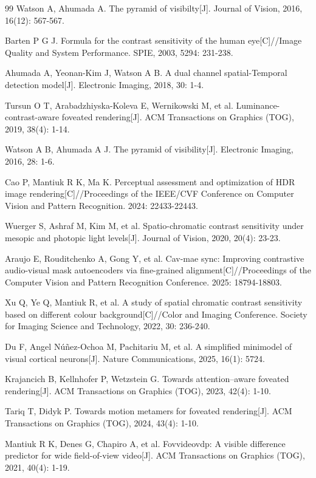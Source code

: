 \begin{thebibliography}{99}
Watson A, Ahumada A. The pyramid of visibilty[J]. Journal of Vision, 2016, 16(12): 567-567.

Barten P G J. Formula for the contrast sensitivity of the human eye[C]//Image Quality and System Performance. SPIE, 2003, 5294: 231-238.

Ahumada A, Yeonan-Kim J, Watson A B. A dual channel spatial-Temporal detection model[J]. Electronic Imaging, 2018, 30: 1-4.

Tursun O T, Arabadzhiyska-Koleva E, Wernikowski M, et al. Luminance-contrast-aware foveated rendering[J]. ACM Transactions on Graphics (TOG), 2019, 38(4): 1-14.

Watson A B, Ahumada A J. The pyramid of visibility[J]. Electronic Imaging, 2016, 28: 1-6.

Cao P, Mantiuk R K, Ma K. Perceptual assessment and optimization of HDR image rendering[C]//Proceedings of the IEEE/CVF Conference on Computer Vision and Pattern Recognition. 2024: 22433-22443.

Wuerger S, Ashraf M, Kim M, et al. Spatio-chromatic contrast sensitivity under mesopic and photopic light levels[J]. Journal of Vision, 2020, 20(4): 23-23.


Araujo E, Rouditchenko A, Gong Y, et al. Cav-mae sync: Improving contrastive audio-visual mask autoencoders via fine-grained alignment[C]//Proceedings of the Computer Vision and Pattern Recognition Conference. 2025: 18794-18803.

Xu Q, Ye Q, Mantiuk R, et al. A study of spatial chromatic contrast sensitivity based on different colour background[C]//Color and Imaging Conference. Society for Imaging Science and Technology, 2022, 30: 236-240.

Du F, Angel Núñez-Ochoa M, Pachitariu M, et al. A simplified minimodel of visual cortical neurons[J]. Nature Communications, 2025, 16(1): 5724.

Krajancich B, Kellnhofer P, Wetzstein G. Towards attention–aware foveated rendering[J]. ACM Transactions on Graphics (TOG), 2023, 42(4): 1-10.

Tariq T, Didyk P. Towards motion metamers for foveated rendering[J]. ACM Transactions on Graphics (TOG), 2024, 43(4): 1-10.

Mantiuk R K, Denes G, Chapiro A, et al. Fovvideovdp: A visible difference predictor for wide field-of-view video[J]. ACM Transactions on Graphics (TOG), 2021, 40(4): 1-19.


\end{thebibliography}
